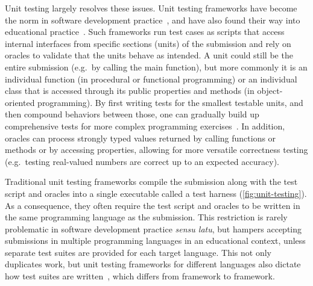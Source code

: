 \documentclass[../main]{subfiles}
\begin{document}
Unit testing largely resolves these issues.
Unit testing frameworks have become the norm in software development practice~\autocite{runesonSurveyUnitTesting2006}, and have also found their way into educational practice~\autocite{bettiniEnvironmentSelfassessingJava2004,ellsworthQuiverSystem2004}.
Such frameworks run test cases as scripts that access internal interfaces from specific sections (units) of the submission and rely on oracles to validate that the units behave as intended.
A unit could still be the entire submission (e.g.\ by calling the main function), but more commonly it is an individual function (in procedural or functional programming) or an individual class that is accessed through its public properties and methods (in object-oriented programming).
By first writing tests for the smallest testable units, and then compound behaviors between those, one can gradually build up comprehensive tests for more complex programming exercises~\autocite{panSoftwareTesting1999}.
In addition, oracles can process strongly typed values returned by calling functions or methods or by accessing properties, allowing for more versatile correctness testing (e.g.\ testing real-valued numbers are correct up to an expected accuracy).

Traditional unit testing frameworks compile the submission along with the test script and oracles into a single executable called a test harness (\vref{fig:unit-testing}).
As a consequence, they often require the test script and oracles to be written in the same programming language as the submission.
This restriction is rarely problematic in software development practice \emph{sensu latu}, but hampers accepting submissions in multiple programming languages in an educational context, unless separate test suites are provided for each target language.
This not only duplicates work, but unit testing frameworks for different languages also dictate how test suites are written~\autocite{agrawalSurveyGradingFormat2022,nayakAutomatedAssessmentTools2022}, which differs from framework to framework.
\end{document}
